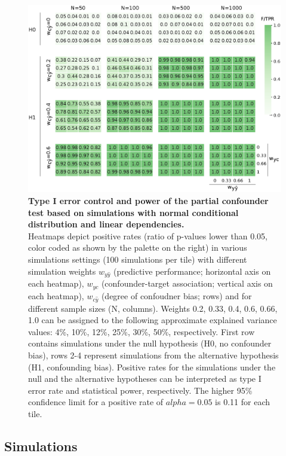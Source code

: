 \documentclass{article}
\begin{document}
\begin{figure}[!b]
  \centering
  \includegraphics[width=0.6\paperwidth]{fig/sim_normal.eps}
  \caption{\textbf{Type I error control and power of the partial confounder test based on simulations with normal conditional distribution and linear dependencies.} \\
  Heatmaps depict positive rates (ratio of p-values lower than 0.05, color coded as shown by the palette on the right) in various simulations settings (100 simulations per tile) with different simulation weights $w_{y\hat{y}}$ (predictive performance; horizontal axis on each heatmap), $w_{yc}$ (confounder-target association; vertical axis on each heatmap), $w_{c\hat{y}}$ (degree of confoudner bias; rows) and for different sample sizes (N, columns). Weights 0.2, 0.33, 0.4, 0.6, 0.66, 1.0 can be assigned to the following approximate explained variance values: 4\%, 10\%, 12\%, 25\%, 30\%, 50\%, respectively. First row contains simulations under the null hypothesis (H0, no confounder bias), rows 2-4 represent simulations from the alternative hypothesis (H1, confounding bias).
  Positive rates for the simulations under the null and the alternative hypotheses can be interpreted as type I error rate and statistical power, respectively. The higher 95\% confidence limit for a positive rate of $alpha=0.05$ is 0.11 for each tile.
  }
  \label{fig:sim-normal}
\end{figure}

\subsection{Simulations}
\end{document}
